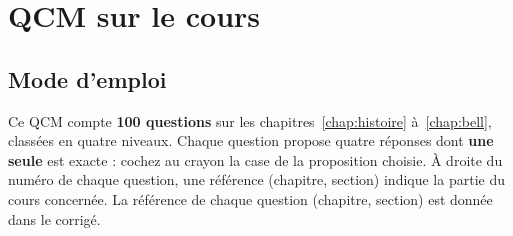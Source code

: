 \newcommand{\qcm@wrongone}[2]{%
  \edef\qcm@a{#2}\edef\qcm@b{\csname qcm@rep@#1\endcsname}%
  \ifx\qcm@a\qcm@b\else
    \noindent\hangindent=1.4em\hangafter=1 {\color{insagris}\textbf{#2)}}\enspace
    \csname qcm@o@#1@#2\endcsname\enspace--\enspace\emph{\csname qcm@c@#1@#2\endcsname}\par
  \fi}

\newcommand{\qcmcorr}[1]{%
  \par\vspace{6pt plus 2pt minus 2pt}\noindent
  \begin{minipage}{\linewidth}\small
    \noindent{\color{insarouge}\bfseries Question~#1}\enspace
    \textbf{Réponse : \csname qcm@rep@#1\endcsname}\hfill
    {\footnotesize\color{insagris}\csname qcm@ref@#1\endcsname}\par\nopagebreak
    \vspace{1pt}\noindent\hangindent=1.4em\hangafter=1
    \textbf{\csname qcm@rep@#1\endcsname)}\enspace
    \csname qcm@o@#1@\csname qcm@rep@#1\endcsname\endcsname\enspace---\enspace
    \csname qcm@c@#1@\csname qcm@rep@#1\endcsname\endcsname\par
    \qcm@wrongone{#1}{A}\qcm@wrongone{#1}{B}\qcm@wrongone{#1}{C}\qcm@wrongone{#1}{D}%
  \end{minipage}\par}
\makeatother

\section{QCM sur le cours}\label{chap:qcm}

\subsection{Mode d'emploi}\label{sec:qcm-mode}

Ce QCM compte \textbf{100 questions} sur les chapitres~\ref{chap:histoire} à~\ref{chap:bell},
classées en quatre niveaux. Chaque question propose quatre réponses dont \textbf{une seule} est
exacte : cochez au crayon la case de la proposition choisie.
\ifqcmrefs À droite du numéro de chaque question, une référence (chapitre, section) indique la
partie du cours concernée.\else\ifqcmcorrige{} La référence de chaque question (chapitre, section)
est donnée dans le corrigé.\fi\fi

